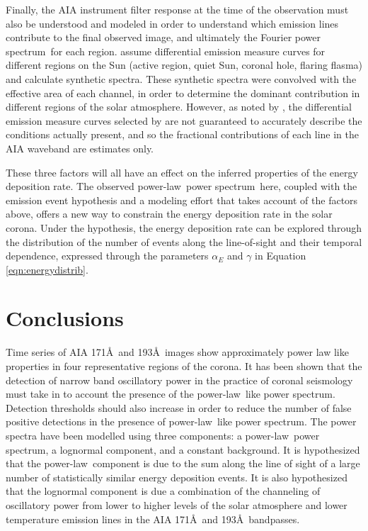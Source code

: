 \documentclass[onecolumn]{emulateapj}
\newcommand{\PS}{power spectrum}
\newcommand{\PL}{power-law}
\newcommand{\Fps}{Fourier \PS}
\newcommand{\BF}{ }
\begin{document}
Finally, the AIA instrument filter response at the time of the
observation must also be understood and modeled {\BF in} order to
understand which emission lines contribute to the final observed
image, and ultimately the \Fps\ for each region.
\cite{2010AA...521A..21O} assume differential emission measure curves
for different regions on the Sun (active region, quiet Sun, coronal
hole, flaring flasma) and calculate synthetic spectra.  These
synthetic spectra were convolved with the effective area of each
channel, in order to determine the dominant contribution in different
regions of the solar atmosphere.  However, as noted by
\cite{2011ApJ...743...23M}, the differential emission measure curves
selected by \cite{2010AA...521A..21O} are not guaranteed to
accurately describe the conditions actually present, and so the
fractional contributions of each line in the AIA waveband are
estimates only.

These three factors will all have an effect on the inferred properties
of the energy deposition rate.  The observed \PL\ \PS\ here, coupled
with the emission event hypothesis and a modeling effort that takes
account of the factors above, offers a new way to constrain the energy
deposition rate in the solar corona.  Under the hypothesis, the energy
deposition rate can be explored through the distribution of the number
of events along the line-of-sight and their temporal dependence,
expressed through the parameters $\alpha_{E}$ and $\gamma$ in Equation
\ref{eqn:energydistrib}.



\section{Conclusions}\label{sec:conc}
Time series of AIA 171\AA\ and 193\AA\ images show approximately power
law like properties {\BF in four representative regions} of the
corona.  {\BF It has been shown that the detection of narrow band
  oscillatory power in the practice of coronal seismology must take in
  to account the presence of the \PL\ like \PS.  Detection thresholds
  should also increase in order to reduce the number of false positive
  detections in the presence of \PL\ like \PS.} The power spectra have
been modelled using three components: a \PL\ \PS, a lognormal
component, and a constant background.  It is hypothesized that the
\PL\ component is due to the sum along the line of sight of a
large number of statistically similar energy deposition events.  It is
also hypothesized that the lognormal component is due a combination of
the channeling of oscillatory power from lower to higher levels of the
solar atmosphere and lower temperature emission lines in the AIA
171\AA\ and 193\AA\ bandpasses.
\end{document}
